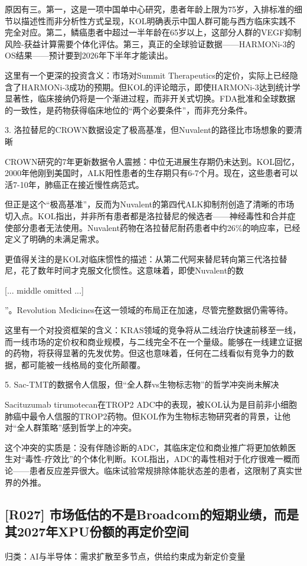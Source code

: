 \documentclass[11pt]{ctexart}
\begin{document}
原因有三。第一，这是一项中国单中心研究，患者年龄上限为75岁，入排标准的细节以描述性而非分析性方式呈现，KOL明确表示中国人群可能与西方临床实践不完全对应。第二，鳞癌患者中超过一半年龄在65岁以上，这部分人群的VEGF抑制风险-获益计算需要个体化评估。第三，真正的全球验证数据——HARMONi-3的OS结果——预计要到2026年下半年才能读出。

这里有一个更深的投资含义：市场对Summit Therapeutics的定价，实际上已经隐含了HARMONi-3成功的预期。但KOL的评论暗示，即使HARMONi-3达到统计学显著性，临床接纳仍将是一个渐进过程，而非开关式切换。FDA批准和全球数据的一致性，是药物获得临床地位的“两个必要条件”，而非充分条件。

3. 洛拉替尼的CROWN数据设定了极高基准，但Nuvalent的路径比市场想象的要清晰

CROWN研究的7年更新数据令人震撼：中位无进展生存期仍未达到。KOL回忆，2000年他刚到美国时，ALK阳性患者的生存期只有6-7个月。现在，这些患者可以活7-10年，肺癌正在接近慢性病范式。

但正是这个“极高基准”，反而为Nuvalent的第四代ALK抑制剂创造了清晰的市场切入点。KOL指出，并非所有患者都是洛拉替尼的候选者——神经毒性和合并症使部分患者无法使用。Nuvalent药物在洛拉替尼耐药患者中约26\%的响应率，已经定义了明确的未满足需求。

更值得关注的是KOL对临床惯性的描述：从第二代阿来替尼转向第三代洛拉替尼，花了数年时间才克服文化惯性。这意味着，即使Nuvalent的数

[... middle omitted ...]

”。Revolution Medicines在这一领域的布局正在加速，尽管完整数据仍需等待。

这里有一个对投资框架的含义：KRAS领域的竞争将从二线治疗快速前移至一线，而一线市场的定价权和商业规模，与二线完全不在一个量级。能够在一线建立证据的药物，将获得显著的先发优势。但这也意味着，任何在二线看似有竞争力的数据，都可能被一线格局的变化所颠覆。

5. Sac-TMT的数据令人信服，但“全人群vs生物标志物”的哲学冲突尚未解决

Sacituzumab tirumotecan在TROP2 ADC中的表现，被KOL认为是目前非小细胞肺癌中最令人信服的TROP2药物。但KOL作为生物标志物研究者的背景，让他对“全人群策略”感到哲学上的冲突。

这个冲突的实质是：没有伴随诊断的ADC，其临床定位和商业推广将更加依赖医生对“毒性-疗效比”的个体化判断。KOL指出，ADC的毒性相对于化疗很难一概而论——患者反应差异很大。临床试验常规排除体能状态差的患者，这限制了真实世界的外推。

\subsection{[R027] 市场低估的不是Broadcom的短期业绩，而是其2027年XPU份额的再定价空间}
{\small\color{refgray}归类：AI与半导体：需求扩散至多节点，供给约束成为新定价变量}
\end{document}
